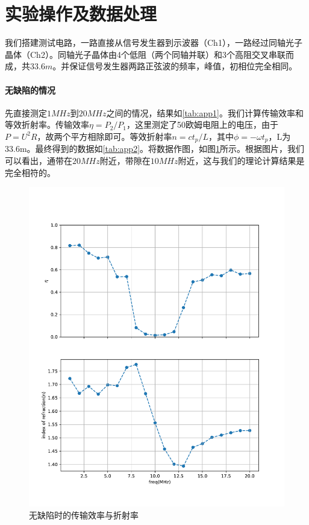 \documentclass[fleqn,10pt]{SelfArx} %
\begin{document}
\section{实验操作及数据处理}

我们搭建测试电路，一路直接从信号发生器到示波器（Ch1），一路经过同轴光子晶体（Ch2）。同轴光子晶体由4个低阻（两个同轴并联）和3个高阻交叉串联而成，共$33.6m$。并保证信号发生器两路正弦波的频率，峰值，初相位完全相同。

\paragraph*{无缺陷的情况} 先直接测定$1MHz$到$20MHz$之间的情况，结果如\ref{tab:app1}。我们计算传输效率和等效折射率。传输效率$\eta=P_2/P_1$，这里测定了50欧姆电阻上的电压，由于$P=U^2R$，故两个平方相除即可。等效折射率$n=ct_p/L$，其中$\phi=-\omega t_p$，L为33.6m。最终得到的数据如\ref{tab:app2}。将数据作图，如图\ref{fig:a1}所示。根据图片，我们可以看出，通带在$20MHz$附近，带隙在$10MHz$附近，这与我们的理论计算结果是完全相符的。
\begin{figure}[htbp]
	\centering
	\includegraphics[width=\linewidth]{C1-eta-n.pdf}
	\caption{无缺陷时的传输效率与折射率}
	\label{fig:a1}
\end{figure}
\end{document}
